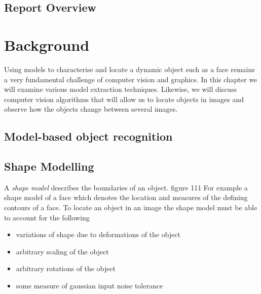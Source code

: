 \documentclass[11pt,a4paper]{book}
\begin{document}
\section{Report Overview}

\newpage

\chapter{Background}
Using models to characterise and locate a dynamic object such as a face remains
a very fundamental challenge of computer vision and graphics. In this chapter we
will examine various model extraction techniques. Likewise, we will discuss
computer vision algorithms that will allow us to locate objects in images and
observe how the objects change between several images.
\section{Model-based object recognition}
\section{Shape Modelling}
A \textit{shape model} describes the boundaries of an object. figure 111 For example a
shape model of a face which denotes the location and measures of the defining
contours of a face. To locate an object in an image the shape model must be able to
account for the following
\begin{itemize}
\item variations of shape due to deformations of the object
\item arbitrary scaling of the object
\item arbitrary rotations of the object
\item some measure of gaussian input noise tolerance
\end{itemize}
\end{document}

